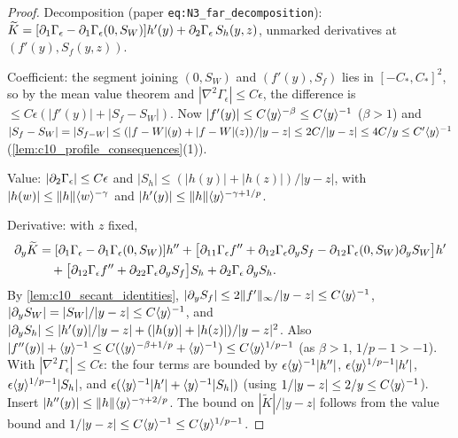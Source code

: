 \begin{proof}
  Decomposition (paper \texttt{eq:N3\_far\_decomposition}):
  $\widetilde K=[\partial_1\Gamma_\epsilon-\partial_1\Gamma_\epsilon(0,S_W)]h'(y)+\partial_2\Gamma_\epsilon\,S_h(y,z)$, unmarked
  derivatives at $(f'(y),S_f(y,z))$.

  Coefficient: the segment joining $(0,S_W)$ and $(f'(y),S_f)$ lies in $[-C_*,C_*]^2$, so by the mean value
  theorem and $|\nabla^2\Gamma_\epsilon|\le C\epsilon$, the difference is $\le C\epsilon(|f'(y)|+|S_f-S_W|)$. Now
  $|f'(y)|\le C\langle y \rangle^{-\beta}\le C\langle y \rangle^{-1}$ ($\beta>1$) and
  $|S_f-S_W|=|S_{f-W}|\le(|f-W|(y)+|f-W|(z))/|y-z|\le 2C/|y-z|\le 4C/y\le C'\langle y \rangle^{-1}$
  (\cref{lem:c10_profile_consequences}(1)).

  Value: $|\partial_2\Gamma_\epsilon|\le C\epsilon$ and $|S_h|\le(|h(y)|+|h(z)|)/|y-z|$, with
  $|h(w)|\le\|h\|\langle w \rangle^{-\gamma}$ and $|h'(y)|\le\|h\|\langle y \rangle^{-\gamma+1/p}$.

  Derivative: with $z$ fixed,
  \begin{align*}
    \partial_y\widetilde K&=[\partial_1\Gamma_\epsilon-\partial_1\Gamma_\epsilon(0,S_W)]h''
    +\bigl[\partial_{11}\Gamma_\epsilon f''+\partial_{12}\Gamma_\epsilon\partial_yS_f-\partial_{12}\Gamma_\epsilon(0,S_W)\partial_yS_W\bigr]h'\\
    &\quad+\bigl[\partial_{12}\Gamma_\epsilon f''+\partial_{22}\Gamma_\epsilon\partial_yS_f\bigr]S_h+\partial_2\Gamma_\epsilon\,\partial_yS_h .
  \end{align*}
  By \cref{lem:c10_secant_identities}, $|\partial_yS_f|\le2\|f'\|_\infty/|y-z|\le C\langle y \rangle^{-1}$,
  $|\partial_yS_W|=|S_W|/|y-z|\le C\langle y \rangle^{-1}$, and
  $|\partial_yS_h|\le|h'(y)|/|y-z|+(|h(y)|+|h(z)|)/|y-z|^2$. Also
  $|f''(y)|+\langle y \rangle^{-1}\le C(\langle y \rangle^{-\beta+1/p}+\langle y \rangle^{-1})\le C\langle y \rangle^{1/p-1}$ (as $\beta>1$, $1/p-1>-1$).
  With $|\nabla^2\Gamma_\epsilon|\le C\epsilon$: the four terms are bounded by
  $\epsilon\langle y \rangle^{-1}|h''|$, $\epsilon\langle y \rangle^{1/p-1}|h'|$, $\epsilon\langle y \rangle^{1/p-1}|S_h|$, and
  $\epsilon(\langle y \rangle^{-1}|h'|+\langle y \rangle^{-1}|S_h|)$ (using $1/|y-z|\le 2/y\le C\langle y \rangle^{-1}$). Insert
  $|h''(y)|\le\|h\|\langle y \rangle^{-\gamma+2/p}$. The bound on $|\widetilde K|/|y-z|$ follows from the value bound
  and $1/|y-z|\le C\langle y \rangle^{-1}\le C\langle y \rangle^{1/p-1}$.
\end{proof}


